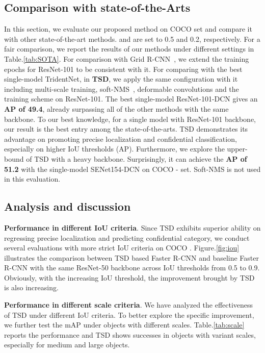 \documentclass[10pt,twocolumn,letterpaper]{article}
\def \algname{TSD}
\begin{document}
\subsection{Comparison with state-of-the-Arts}
In this section, we evaluate our proposed method on COCO  set and compare it with other state-of-the-art methods.  and  are set to 0.5 and 0.2, respectively.
For a fair comparison, we report the results of our methods under different settings in Table.\ref{tab:SOTA}.
For comparison with Grid R-CNN~\cite{lu2019grid}, we extend the training epochs for ResNet-101 to be consistent with it.
For comparing with the best single-model TridentNet, in \textbf{\algname{}}, we apply the same configuration with it including multi-scale training, soft-NMS~\cite{bodla2017soft}, deformable convolutions and the  training scheme on ResNet-101.
The best single-model ResNet-101-DCN gives an \textbf{AP of 49.4}, already surpassing all of the other methods with the same backbone. To our best knowledge, for a single model with ResNet-101 backbone, our result is the best entry among the state-of-the-arts.
\algname{} demonstrates its advantage on promoting precise localization and confidential classification, especially on higher IoU thresholds (AP).
Furthermore, we explore the upper-bound of \algname{} with a heavy backbone.
Surprisingly, it can achieve the \textbf{AP of 51.2} with the single-model SENet154-DCN on COCO - set. Soft-NMS is not used in this evaluation.



\subsection{Analysis and discussion}
\textbf{Performance in different IoU criteria}.
Since \algname{} exhibits superior ability on regressing precise localization and predicting confidential category, we conduct several evaluations with more strict IoU criteria on COCO .
Figure.\ref{fig:iou} illustrates the comparison
between \algname{} based Faster R-CNN and baseline Faster R-CNN with
the same ResNet-50 backbone across IoU thresholds from
0.5 to 0.9.
Obviously, with the increasing IoU threshold, the improvement brought by \algname{} is also increasing.




\textbf{Performance in different scale criteria}.
We have analyzed the effectiveness of \algname{} under different IoU criteria.
To better explore the specific improvement, we further test the mAP under objects with different scales. Table.\ref{tab:scale} reports the performance and \algname{} shows successes in objects with variant scales, especially for medium and large objects.
\end{document}
